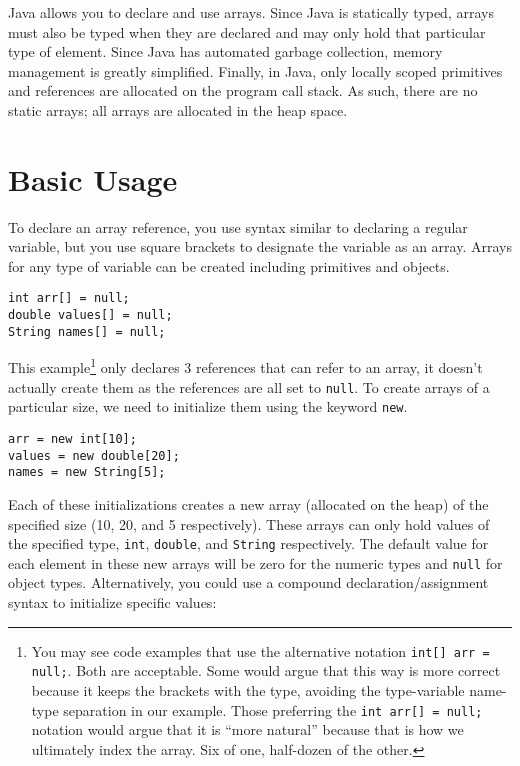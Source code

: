 

Java allows you to declare and use arrays.  Since Java is statically
typed, arrays must also be typed when they are declared and
may only hold that particular type of element.  Since Java has
automated garbage collection, memory management is greatly
simplified.  Finally, in Java, only locally scoped primitives and 
references are allocated on the program call stack.  As such,
there are no static arrays; all arrays are allocated in the heap
space.

\section{Basic Usage}

To declare an array reference, you use syntax similar to declaring
a regular variable, but you use square brackets to designate
the variable as an array.  Arrays for any type of variable can
be created including primitives and objects.

\begin{verbatim}
int arr[] = null;
double values[] = null;
String names[] = null;
\end{verbatim}

This example\footnote{You may see code examples that use the
alternative notation \texttt{int[] arr = null;}.  Both are
acceptable.  Some would argue that this way is more correct because
it keeps the brackets with the type, avoiding the type-variable name-type
separation in our example.  Those preferring the \texttt{int arr[] = null;}
notation would argue that it is ``more natural'' because that is how we
ultimately index the array.  Six of one, half-dozen of the other.} 
only declares 3 references that can refer to an array, 
it doesn't actually create them as the references are all set to 
\texttt{null}.  To create arrays of a particular size, we
need to initialize them using the keyword \texttt{new}.  

\begin{verbatim}
arr = new int[10];
values = new double[20];
names = new String[5];
\end{verbatim}

Each of these initializations creates a new array (allocated on the 
heap) of the specified size (10, 20, and 5 respectively).  These 
arrays can only hold values of the specified type, \texttt{int},
\texttt{double}, and \texttt{String} respectively.
The default value for each element in
these new arrays will be zero for the numeric types and \texttt{null}
for object types.  Alternatively, you could use a compound declaration/assignment
syntax to initialize specific values:

